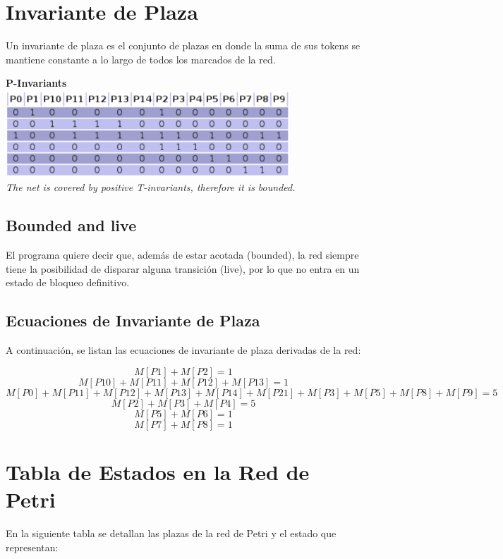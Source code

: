 \documentclass[12pt]{article}
\begin{document}
\section{Invariante de Plaza}
Un invariante de plaza es el conjunto de plazas en donde la suma de sus tokens se mantiene constante a lo largo de todos los marcados de la red.

\begin{center}
    \textbf{P-Invariants}\\
    \includegraphics[width=0.8\textwidth]{P-invariants.png}\\
    \textit{The net is covered by positive T-invariants, therefore it is bounded.}
\end{center}

\subsection{Bounded and live}
El programa quiere decir que, además de estar acotada (bounded), la red siempre tiene la posibilidad de disparar alguna transición (live), por lo que no entra en un estado de bloqueo definitivo.

\subsection{Ecuaciones de Invariante de Plaza}
A continuación, se listan las ecuaciones de invariante de plaza derivadas de la red:

\[
M[P1] + M[P2] = 1
\]
\[
M[P10] + M[P11] + M[P12] + M[P13] = 1
\]
\[
M[P0] + M[P11] + M[P12] + M[P13] + M[P14] + M[P21] + M[P3] + M[P5] + M[P8] + M[P9] = 5
\]
\[
M[P2] + M[P3] + M[P4] = 5
\]
\[
M[P5] + M[P6] = 1
\]
\[
M[P7] + M[P8] = 1
\]

\section{Tabla de Estados en la Red de Petri}
En la siguiente tabla se detallan las plazas de la red de Petri y el estado que representan:
\end{document}
